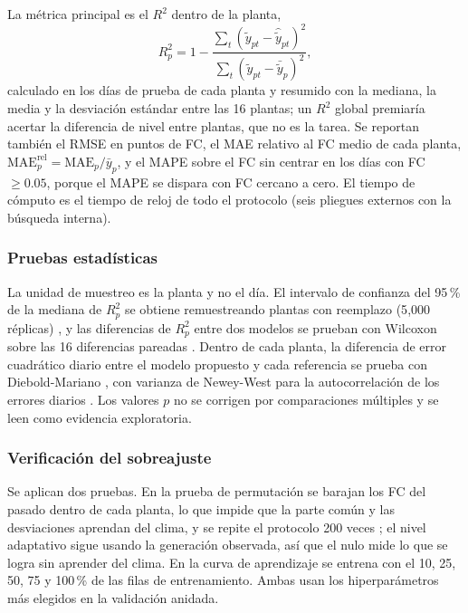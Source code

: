 \documentclass[pdflatex,sn-mathphys-num]{sn-jnl}
\begin{document}
La métrica principal es el $R^2$ dentro de la planta,
\begin{equation}
R^2_p = 1 - \frac{\sum_{t}(\tilde{y}_{pt}-\hat{\tilde{y}}_{pt})^2}{\sum_{t}(\tilde{y}_{pt}-\bar{\tilde{y}}_p)^2},
\label{eq:r2}
\end{equation}
calculado en los días de prueba de cada planta y resumido con la mediana, la media y la desviación estándar entre las 16 plantas; un $R^2$ global premiaría acertar la diferencia de nivel entre plantas, que no es la tarea. Se reportan también el RMSE en puntos de FC, el MAE relativo al FC medio de cada planta, $\text{MAE}^{\text{rel}}_p = \text{MAE}_p / \bar{y}_p$, y el MAPE sobre el FC sin centrar en los días con FC $\geq 0.05$, porque el MAPE se dispara con FC cercano a cero. El tiempo de cómputo es el tiempo de reloj de todo el protocolo (seis pliegues externos con la búsqueda interna).

\subsubsection{Pruebas estadísticas}

La unidad de muestreo es la planta y no el día. El intervalo de confianza del 95\,\% de la mediana de $R^2_p$ se obtiene remuestreando plantas con reemplazo (5{,}000 réplicas) \cite{field2007bootstrap}, y las diferencias de $R^2_p$ entre dos modelos se prueban con Wilcoxon sobre las 16 diferencias pareadas \cite{wilcoxon1945}. Dentro de cada planta, la diferencia de error cuadrático diario entre el modelo propuesto y cada referencia se prueba con Diebold-Mariano \cite{diebold1995comparing}, con varianza de Newey-West para la autocorrelación de los errores diarios \cite{newey1987hac}. Los valores $p$ no se corrigen por comparaciones múltiples y se leen como evidencia exploratoria.

\subsubsection{Verificación del sobreajuste}

Se aplican dos pruebas. En la prueba de permutación se barajan los FC del pasado dentro de cada planta, lo que impide que la parte común y las desviaciones aprendan del clima, y se repite el protocolo 200 veces \cite{ojala2010permutation}; el nivel adaptativo sigue usando la generación observada, así que el nulo mide lo que se logra sin aprender del clima. En la curva de aprendizaje se entrena con el 10, 25, 50, 75 y 100\,\% de las filas de entrenamiento. Ambas usan los hiperparámetros más elegidos en la validación anidada.
\end{document}
